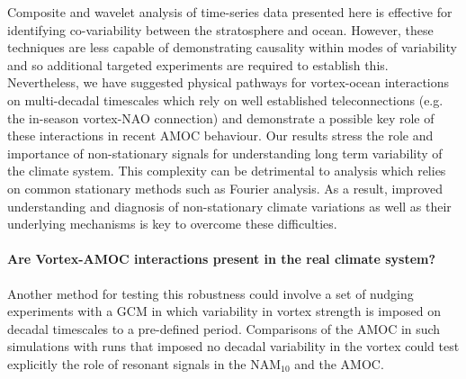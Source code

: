 Composite and wavelet analysis of time-series data presented here is effective for identifying co-variability between the stratosphere and ocean. However, these techniques are less capable of demonstrating causality within modes of variability and so additional targeted experiments are required to establish this. Nevertheless, we have suggested physical pathways for vortex-ocean interactions on multi-decadal timescales which rely on well established teleconnections (e.g. the in-season vortex-NAO connection) and demonstrate a possible key role of these interactions in recent AMOC behaviour. Our results stress the role and importance of non-stationary signals for understanding long term variability of the climate system. This complexity can be detrimental to analysis which relies on common stationary methods such as Fourier analysis. As a result, improved understanding and diagnosis of non-stationary climate variations as well as their underlying mechanisms is key to overcome these difficulties. 






\paragraph{Are Vortex-AMOC interactions present in the real climate system?} 

Another method for testing this robustness could involve a set of nudging experiments with a GCM in which variability in vortex strength is imposed on decadal timescales to a pre-defined period. Comparisons of the AMOC in such simulations with runs that imposed no decadal variability in the vortex could test explicitly the role of resonant signals in the NAM$_{10}$ and the AMOC. 